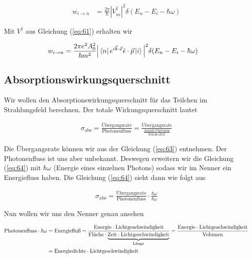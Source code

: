 \begin{align}
  \label{eq:62}
   w_{i\rightarrow n} &= \frac{2\pi}{\hbar}|V_{ni}^\dagger|^2 \delta(E_n - E_i - \hbar\omega)
\end{align}

Mit \(V^\dagger\) aus Gleichung (\ref{eq:61}) erhalten wir

\begin{align}
  \label{eq:63}
  w_{i\rightarrow n} &= \frac{2\pi e^2 A_0^2}{\hbar m^2}\Big| \left\langle n \right| e^{i\vec k\cdot \vec x} \hat\epsilon \cdot \vec p \left| i \right\rangle \Big|^2 \delta(E_n - E_i - \hbar\omega)
\end{align}

\subsection*{Absorptionswirkungsquerschnitt}

Wir wollen den Absorptionswirkungsquerschnitt für das Teilchen im Strahlungsfeld berechnen. Der totale Wirkungsquerschnitt lautet

\begin{align}
  \label{eq:64}
  \sigma_{\text{abs}} = \frac{\text{Übergangsrate}}{\text{Photonenfluss}} = \frac{\text{Übergangsrate}}{\frac{\text{Anzahl Photonen}}{\text{Fläche}\cdot\text{Zeit}}}
\end{align}

Die Übergangsrate können wir aus der Gleichung (\ref{eq:63}) entnehmen. Der Photonenfluss ist uns aber unbekannt. Deswegen erweitern wir die Gleichung (\ref{eq:64}) mit \(\hbar\omega\) (Energie eines einzelnen Photons) sodass wir im Nenner ein Energiefluss haben. Die Gleichung (\ref{eq:64}) sieht dann wie folgt aus

\begin{align}
  \label{eq:65}
  \sigma_{\text{abs}} = \frac{\text{Übergangsrate}}{\text{Photonenfluss}}\cdot \frac{\hbar\omega}{\hbar\omega}
\end{align}

Nun wollen wir uns den Nenner genau ansehen

\begin{align}
  \label{eq:66}
  \text{Photonenfluss}\cdot\hbar\omega &= \text{Energiefluß} = \frac{\text{Energie}\cdot \text{Lichtgeschwindigkeit}}{\text{Fläche}\cdot\underbr{\text{Zeit}\cdot \text{Lichtgeschwindigkeit}}_{\text{Länge}}} = \frac{\text{Energie}\cdot \text{Lichtgeschwindigkeit}}{\text{Volumen}} \notag \\
&= \text{Energiedichte} \cdot \text{Lichtgeschwindigkeit}
\end{align}


